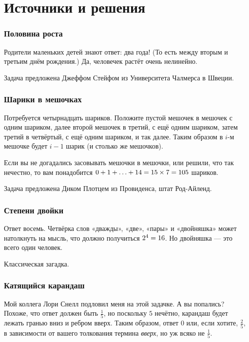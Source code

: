 \section*{Источники и решения}

\subsubsection*{Половина роста}

Родители маленьких детей знают ответ: два года!
(То есть между вторым и третьим днём рождения.)
Да, человечек растёт очень нелинейно.

Задача предложена Джеффом Стейфом из Университета Чалмерса в Швеции.

\subsubsection*{Шарики в мешочках}

Потребуется четырнадцать шариков.
Положите пустой мешочек в мешочек с одним шариком, 
далее второй мешочек в третий, с ещё одним шариком, затем третий в четвёртый, с ещё одним шариком, и так далее.
Таким образом в $i$-м мешочке будет $i-1$ шарик (и столько же мешочков).

Если вы не догадались засовывать мешочки в мешочки, или решили, что так нечестно, то вам понадобится $0 + 1 \z+ \z\dots \z+ 14 \z= 15 \times 7 \z= 105$ шариков.

Задача предложена Диком Плотцем из Провиденса, штат Род-Айленд.

\subsubsection*{Степени двойки}

Ответ восемь.
Четвёрка слов «дважды», «две», «пары» и «двойняшка» может натолкнуть на мысль, что должно получиться $2^4 \z= 16$.
Но двойняшка — это всего один человек.

Классическая загадка.

\subsubsection*{Катящийся карандаш}

Мой коллега Лори Снелл подловил меня на этой задачке.
А вы попались?
Похоже, что ответ должен быть $\tfrac15$, но поскольку $5$ нечётно, карандаш будет лежать гранью вниз и ребром вверх.
Таким образом, ответ $0$ или, если хотите, $\tfrac25$, в зависимости от вашего толкования термина \emph{вверх}, но уж всяко не $\tfrac15$.

